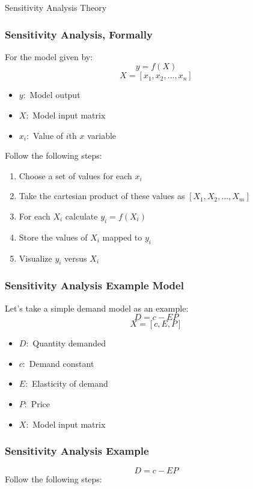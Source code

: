 \documentclass[handout, 11pt]{beamer}
\begin{document}
\begin{section}[SA Theory]{Sensitivity Analysis Theory}
\begin{frame}
\frametitle{Sensitivity Analysis, Formally}
For the model given by:
\begin{equation}
	y = f(X)
\end{equation}
\begin{equation}
	X = [x_1, x_2, ..., x_n]
\end{equation}
\begin{itemize}
\item $y:$
Model output
\item $X:$
Model input matrix
\item $x_i:$
Value of $i$th $x$ variable
\end{itemize}
Follow the following steps:
\begin{enumerate}
\item Choose a set of values for each
$x_i$
\item Take the cartesian product of these values as
$[X_1, X_2, ..., X_m]$
\item For each
$X_i$
calculate
$y_i = f(X_i)$
\item Store the values of
$X_i$
mapped to
$y_i$
\item Visualize
$y_i$
versus
$X_i$
\end{enumerate}
\end{frame}
\begin{frame}
\frametitle{Sensitivity Analysis Example Model}
Let's take a simple demand model as an example:
\begin{equation}
	D = c - EP
\end{equation}
\begin{equation}
	X = [c, E, P]
\end{equation}
\begin{itemize}
\item $D:$
Quantity demanded
\item $c:$
Demand constant
\item $E:$
Elasticity of demand
\item $P:$
Price
\item $X:$
Model input matrix
\end{itemize}
\end{frame}
\begin{frame}
\frametitle{Sensitivity Analysis Example}
\begin{equation}
	D = c - EP
\end{equation}
Follow the following steps:
\begin{enumerate}

\end{enumerate}
\end{frame}
\end{section}
\end{document}
